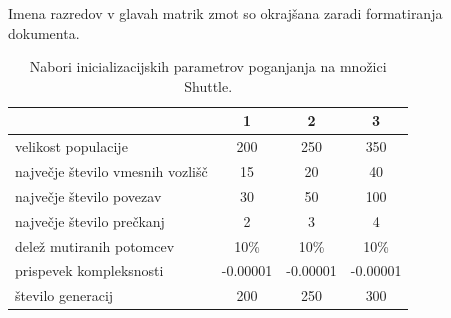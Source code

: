 Imena razredov v glavah matrik zmot so okrajšana zaradi formatiranja dokumenta.
\begin{table}[H]
    \begin{center}
        \begin{tabular}{||l c c c||}
            \hline
            & 1        & 2        & 3 \\ [0.5ex]
            \hline
            velikost populacije               & 200      & 250      & 350      \\
            \hline
            največje število vmesnih vozlišč & 15       & 20       & 40       \\
            \hline
            največje število povezav          & 30       & 50       & 100      \\
            \hline
            največje število prečkanj         & 2        & 3        & 4        \\
            \hline
            delež mutiranih potomcev          & 10\%     & 10\%     & 10\%     \\
            \hline
            prispevek kompleksnosti           & -0.00001 & -0.00001 & -0.00001 \\
            \hline
            število generacij                 & 200      & 250      & 300      \\
            \hline
        \end{tabular}
    \end{center}
    \caption{Nabori inicializacijskih parametrov poganjanja na množici Shuttle.}
    \label{tab:param_statlog}
\end{table}

